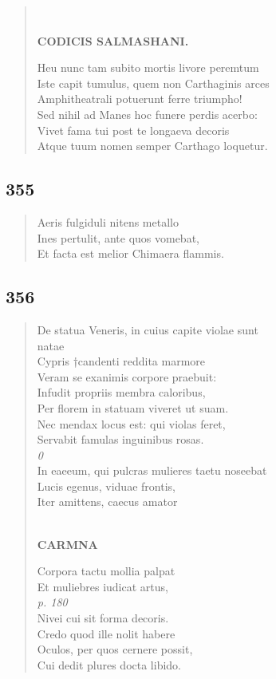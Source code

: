 \documentclass[11pt, a4paper]{report}
\begin{document}
\begin{verse}
        ﻿\pagebreak 
    \begin{center} \textbf{CODICIS SALMASHANI.} \end{center} \marginpar{[279]} Heu nunc tam subito mortis livore peremtum \\ Iste capit tumulus, quem non Carthaginis arces \\ Amphitheatrali potuerunt ferre triumpho! \\ Sed nihil ad Manes hoc funere perdis acerbo: \\ Vivet fama tui post te longaeva decoris \\ Atque tuum nomen semper Carthago loquetur. \\ 
      \end{verse}
  
            \subsection*{355}
      \begin{verse}
      Aeris fulgiduli nitens metallo \\ Ines pertulit, ante quos vomebat, \\ Et facta est melior Chimaera flammis. \\ 
      \end{verse}
  
            \subsection*{356}
      \begin{verse}
      De statua Veneris, in cuius capite violae sunt \\ natae \\ Cypris †candenti reddita marmore \\ Veram se exanimis corpore praebuit: \\ Infudit propriis membra caloribus, \\ Per florem in statuam viveret ut suam. \\ Nec mendax locus est: qui violas feret, \\ Servabit famulas inguinibus rosas. \\ \textit{0} \\ In eaeeum, qui pulcras mulieres taetu noseebat \\ Lucis egenus, viduae frontis, \\ Iter amittens, caecus amator \\ 
        ﻿\pagebreak 
    \begin{center} \textbf{CARMNA} \end{center} \marginpar{[280]} Corpora tactu mollia palpat \\ Et muliebres iudicat artus, \\ \textit{p. 180} \\ Nivei cui sit forma decoris. \\ Credo quod ille nolit habere \\ Oculos, per quos cernere possit, \\ Cui dedit plures docta libido. \\ 
      \end{verse}
  
\end{document}
